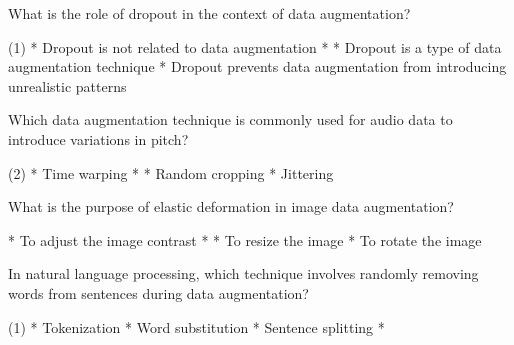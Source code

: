 \documentclass[11pt]{extarticle}
\begin{document}
\begin{exercise}
    What is the role of dropout in the context of data augmentation?
    \begin{choice} (1)
        * Dropout is not related to data augmentation
        * 
        * Dropout is a type of data augmentation technique
        * Dropout prevents data augmentation from introducing unrealistic patterns
    \end{choice}
\end{exercise}
\begin{solution}
\end{solution}

\begin{exercise}
    Which data augmentation technique is commonly used for audio data to introduce variations in pitch?
    \begin{choice} (2)
        * Time warping
        * 
        * Random cropping
        * Jittering
    \end{choice}
\end{exercise}
\begin{solution}
\end{solution}

\begin{exercise}
    What is the purpose of elastic deformation in image data augmentation?
    \begin{choice}
        * To adjust the image contrast
        * 
        * To resize the image
        * To rotate the image
    \end{choice}
\end{exercise}
\begin{solution}
\end{solution}

\begin{exercise}
    In natural language processing, which technique involves randomly removing words from sentences during data augmentation?
    \begin{choice} (1)
        * Tokenization
        * Word substitution
        * Sentence splitting
        * 
    \end{choice}
\end{exercise}
\begin{solution}
\end{solution}
\end{document}
